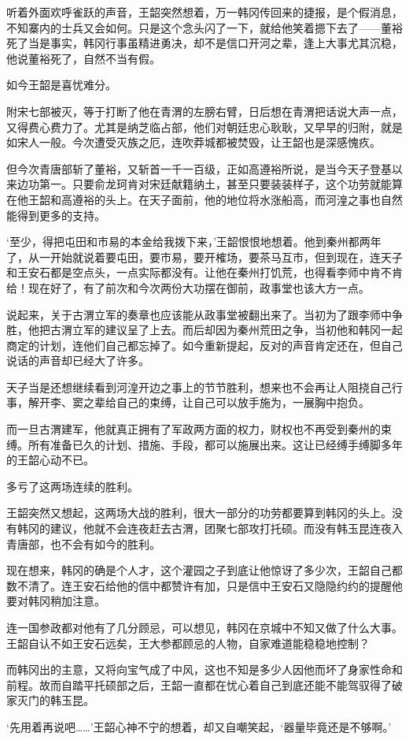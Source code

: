听着外面欢呼雀跃的声音，王韶突然想着，万一韩冈传回来的捷报，是个假消息，不知寨内的士兵又会如何。只是这个念头闪了一下，就给他笑着摁下去了——董裕死了当是事实，韩冈行事虽精进勇决，却不是信口开河之辈，逢上大事尤其沉稳，他说董裕死了，自然不当有假。

如今王韶是喜忧难分。

附宋七部被灭，等于打断了他在青渭的左膀右臂，日后想在青渭把话说大声一点，又得费心费力了。尤其是纳芝临占部，他们对朝廷忠心耿耿，又早早的归附，就是如宋人一般。今次遭受灭族之厄，连吹莽城都被焚毁，让王韶也是深感愧疚。

但今次青唐部斩了董裕，又斩首一千一百级，正如高遵裕所说，是当今天子登基以来边功第一。只要俞龙珂肯对宋廷献籍纳土，甚至只要装装样子，这个功劳就能算在他王韶和高遵裕的头上。在天子面前，他的地位将水涨船高，而河湟之事也自然能得到更多的支持。

‘至少，得把屯田和市易的本金给我拨下来，’王韶恨恨地想着。他到秦州都两年了，从一开始就说着要屯田，要市易，要开榷场，要茶马互市，但到现在，连天子和王安石都是空点头，一点实际都没有。让他在秦州打饥荒，也得看李师中肯不肯给！现在好了，有了前次和今次两份大功摆在御前，政事堂也该大方一点。

说起来，关于古渭立军的奏章也应该能从政事堂被翻出来了。当初为了跟李师中争胜，他把古渭立军的建议呈了上去。而后却因为秦州荒田之争，当初他和韩冈一起商定的计划，连他们自己都忘掉了。如今重新提起，反对的声音肯定还在，但自己说话的声音却已经大了许多。

天子当是还想继续看到河湟开边之事上的节节胜利，想来也不会再让人阻挠自己行事，解开李、窦之辈给自己的束缚，让自己可以放手施为，一展胸中抱负。

而一旦古渭建军，他就真正拥有了军政两方面的权力，财权也不再受到秦州的束缚。所有准备已久的计划、措施、手段，都可以施展出来。这让已经缚手缚脚多年的王韶心动不已。

多亏了这两场连续的胜利。

王韶突然又想起，这两场大战的胜利，很大一部分的功劳都要算到韩冈的头上。没有韩冈的建议，他就不会连夜赶去古渭，团聚七部攻打托硕。而没有韩玉昆连夜入青唐部，也不会有如今的胜利。

现在想来，韩冈的确是个人才，这个灌园之子到底让他惊讶了多少次，王韶自己都数不清了。连王安石给他的信中都赞许有加，只是信中王安石又隐隐约约的提醒他要对韩冈稍加注意。

连一国参政都对他有了几分顾忌，可以想见，韩冈在京城中不知又做了什么大事。王韶自认不如王安石远矣，王大参都顾忌的人物，自家难道能稳稳地控制？

而韩冈出的主意，又将向宝气成了中风，这也不知是多少人因他而坏了身家性命和前程。故而自踏平托硕部之后，王韶一直都在忧心着自己到底还能不能驾驭得了破家灭门的韩玉昆。

‘先用着再说吧……’王韶心神不宁的想着，却又自嘲笑起，‘器量毕竟还是不够啊。’

